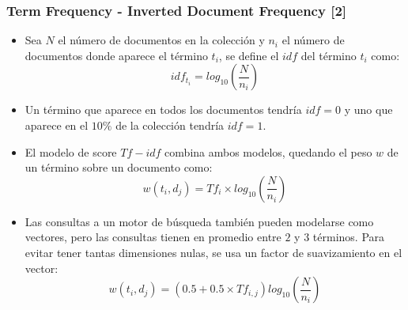 \documentclass[handout]{beamer}
\begin{document}
\begin{frame}\frametitle{Term Frequency - Inverted Document Frequency [2]}
\footnotesize{ 
\begin{itemize}
 \item Sea $N$ el número de documentos en la colección y $n_{i}$ el número de documentos donde aparece el término $t_{i}$, se define el $idf$ del término $t_{i}$ como: 
 \begin{displaymath}
  idf_{t_{i}}= log_{10}(\frac{N}{n_{i}})
 \end{displaymath}
\item Un término que aparece en todos los documentos tendría $idf=0$ y uno que aparece en el $10\%$ de la colección tendría $idf=1$.

\item El modelo de score $Tf-idf$ combina ambos modelos, quedando el peso $w$ de un término sobre un documento como:
\begin{displaymath}
w(t_{i},d_{j})=Tf_{i}\times log_{10}(\frac{N}{n_{i}}) 
\end{displaymath}

\item Las consultas a un motor de búsqueda también pueden modelarse como vectores, pero las consultas tienen en promedio entre $2$ y $3$ términos. Para evitar tener tantas dimensiones nulas, se usa un factor de suavizamiento en el vector:
\begin{displaymath}
 w(t_{i},d_{j})=(0.5+0.5\times Tf_{i,j})log_{10}(\frac{N}{n_{i}}) 
\end{displaymath}



\end{itemize}



}

\end{frame}
\end{document}
